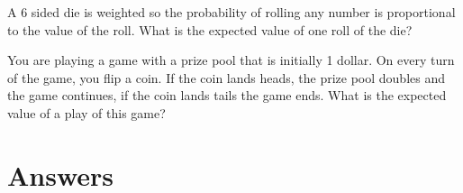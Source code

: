 \documentclass{amsbook}
\begin{document}
\begin{Answer}[ref={ev3}]
    
\end{Answer}

\begin{Exercise}[title={A Strange Die}, difficulty=2, label=ev4]
    A 6 sided die is weighted so the probability of rolling any number is proportional to the value of the roll. What is the expected value of one roll of the die?
\end{Exercise}

\begin{Answer}[ref={ev4}]
    
\end{Answer}

\begin{Exercise}[title={A Long Game?}, difficulty=3, label=ev5]
    You are playing a game with a prize pool that is initially 1 dollar. On every turn of the game, you flip a coin. If the coin lands heads, the prize pool doubles and the game continues, if the coin lands tails the game ends. What is the expected value of a play of this game?
\end{Exercise}

\begin{Answer}[ref={ev5}]
    
\end{Answer}


\chapter{Answers}
\shipoutAnswer

\printbibliography
\end{document}
